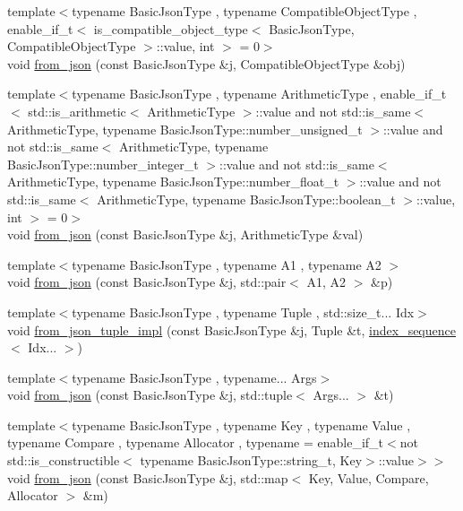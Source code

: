 \begin{DoxyCompactItemize}
\item 
{\footnotesize template$<$typename Basic\+Json\+Type , typename Compatible\+Object\+Type , enable\+\_\+if\+\_\+t$<$ is\+\_\+compatible\+\_\+object\+\_\+type$<$ Basic\+Json\+Type, Compatible\+Object\+Type $>$\+::value, int $>$  = 0$>$ }\\void \hyperlink{namespacenlohmann_1_1detail_a5e7a3674e8ac46f8feebad9712d7c55f}{from\+\_\+json} (const Basic\+Json\+Type \&j, Compatible\+Object\+Type \&obj)
\item 
{\footnotesize template$<$typename Basic\+Json\+Type , typename Arithmetic\+Type , enable\+\_\+if\+\_\+t$<$ std\+::is\+\_\+arithmetic$<$ Arithmetic\+Type $>$\+::value and not std\+::is\+\_\+same$<$ Arithmetic\+Type, typename Basic\+Json\+Type\+::number\+\_\+unsigned\+\_\+t $>$\+::value and not std\+::is\+\_\+same$<$ Arithmetic\+Type, typename Basic\+Json\+Type\+::number\+\_\+integer\+\_\+t $>$\+::value and not std\+::is\+\_\+same$<$ Arithmetic\+Type, typename Basic\+Json\+Type\+::number\+\_\+float\+\_\+t $>$\+::value and not std\+::is\+\_\+same$<$ Arithmetic\+Type, typename Basic\+Json\+Type\+::boolean\+\_\+t $>$\+::value, int $>$  = 0$>$ }\\void \hyperlink{namespacenlohmann_1_1detail_a839b0ab50d2c9bce669068f56bc41202}{from\+\_\+json} (const Basic\+Json\+Type \&j, Arithmetic\+Type \&val)
\item 
{\footnotesize template$<$typename Basic\+Json\+Type , typename A1 , typename A2 $>$ }\\void \hyperlink{namespacenlohmann_1_1detail_aae9f9c2601074e323d49428132cc293d}{from\+\_\+json} (const Basic\+Json\+Type \&j, std\+::pair$<$ A1, A2 $>$ \&p)
\item 
{\footnotesize template$<$typename Basic\+Json\+Type , typename Tuple , std\+::size\+\_\+t... Idx$>$ }\\void \hyperlink{namespacenlohmann_1_1detail_a28253915d9db4a0112d60eaee0422949}{from\+\_\+json\+\_\+tuple\+\_\+impl} (const Basic\+Json\+Type \&j, Tuple \&t, \hyperlink{structnlohmann_1_1detail_1_1index__sequence}{index\+\_\+sequence}$<$ Idx... $>$)
\item 
{\footnotesize template$<$typename Basic\+Json\+Type , typename... Args$>$ }\\void \hyperlink{namespacenlohmann_1_1detail_a8b99ec9b29f3f20a18fc4281fb784e49}{from\+\_\+json} (const Basic\+Json\+Type \&j, std\+::tuple$<$ Args... $>$ \&t)
\item 
{\footnotesize template$<$typename Basic\+Json\+Type , typename Key , typename Value , typename Compare , typename Allocator , typename  = enable\+\_\+if\+\_\+t$<$not std\+::is\+\_\+constructible$<$                                     typename Basic\+Json\+Type\+::string\+\_\+t, Key$>$\+::value$>$$>$ }\\void \hyperlink{namespacenlohmann_1_1detail_ae93147a54d2740228ef16a5e6210ca3e}{from\+\_\+json} (const Basic\+Json\+Type \&j, std\+::map$<$ Key, Value, Compare, Allocator $>$ \&m)

\end{DoxyCompactItemize}

